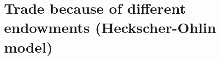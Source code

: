 	\pbn
	

	
	
	
	
	\section{Trade because of different endowments (Heckscher-Ohlin model)}\label{sec:ho}
	
	
	
	
